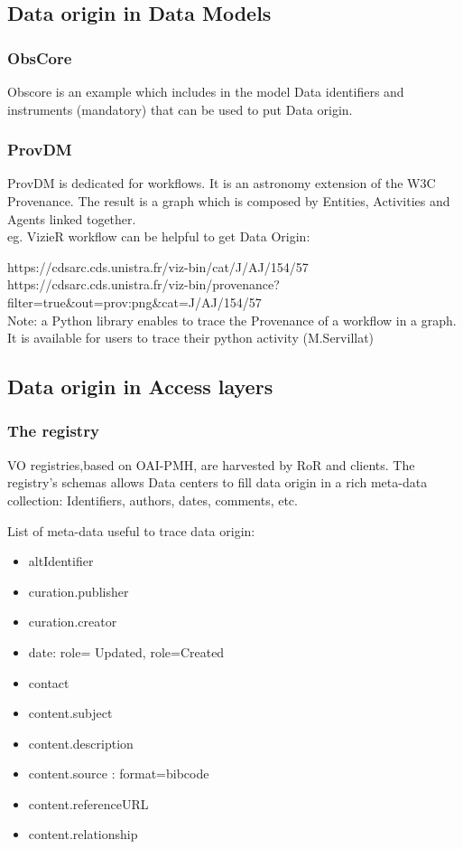 \documentclass[11pt,a4paper]{ivoa}
\begin{document}
\subsection{Data origin in Data Models}
\subsubsection{ObsCore} 
Obscore is an example which includes in the model Data  identifiers and instruments (mandatory) that can be used to put Data origin. 

\subsubsection{ProvDM}
ProvDM is dedicated for workflows. It is an astronomy extension of the W3C Provenance. The result is a graph which is composed by Entities, Activities and Agents linked together.\\
eg. VizieR workflow can be helpful to get Data Origin:
	
	https://cdsarc.cds.unistra.fr/viz-bin/cat/J/AJ/154/57\\
	https://cdsarc.cds.unistra.fr/viz-bin/provenance?filter=true\&out=prov:png\&cat=J/AJ/154/57 \\
	
	
Note:  a Python library enables to trace the Provenance of a workflow in a graph. It is available for users to trace their python activity (M.Servillat)


\subsection{Data origin in Access layers}

\subsubsection{The registry} 
VO registries,based on OAI-PMH, are harvested by RoR and clients. The registry's schemas allows Data centers to fill data origin in a rich meta-data collection: Identifiers, authors, dates, comments, etc.

List of meta-data useful to trace data origin:
\begin{itemize}
	\item altIdentifier
	\item curation.publisher
	\item curation.creator
	\item date: role= Updated, role=Created
	\item contact
	\item content.subject
	\item content.description
	\item content.source : format=bibcode
	\item content.referenceURL
	\item content.relationship
\end{itemize}
\end{document}
